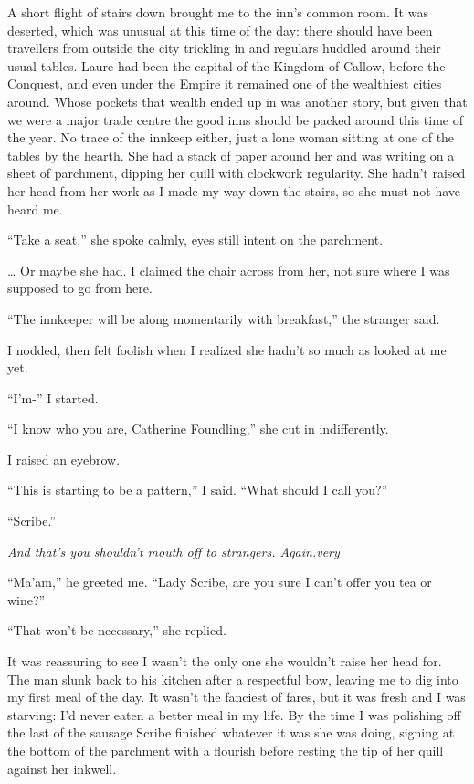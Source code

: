 \documentclass[12pt, openany]{book}
\begin{document}
A short flight of stairs down brought me to the inn’s common room. It was deserted, which was unusual at this time of the day: there should have been travellers from outside the city trickling in and regulars huddled around their usual tables. Laure had been the capital of the Kingdom of Callow, before the Conquest, and even under the Empire it remained one of the wealthiest cities around. Whose pockets that wealth ended up in was another story, but given that we were a major trade centre the good inns should be packed around this time of the year. No trace of the innkeep either, just a lone woman sitting at one of the tables by the hearth. She had a stack of paper around her and was writing on a sheet of parchment, dipping her quill with clockwork regularity. She hadn’t raised her head from her work as I made my way down the stairs, so she must not have heard me.

“Take a seat,” she spoke calmly, eyes still intent on the parchment.

… Or maybe she had. I claimed the chair across from her, not sure where I was supposed to go from here.

“The innkeeper will be along momentarily with breakfast,” the stranger said.

I nodded, then felt foolish when I realized she hadn’t so much as looked at me yet.

“I’m-” I started.

“I know who you are, Catherine Foundling,” she cut in indifferently.

I raised an eyebrow.

“This is starting to be a pattern,” I said. “What should I call you?”

“Scribe.”

\textit{And that’s you shouldn’t mouth off to strangers. Again.}\textit{very}

“Ma’am,” he greeted me. “Lady Scribe, are you sure I can’t offer you tea or wine?”

“That won’t be necessary,” she replied.

It was reassuring to see I wasn’t the only one she wouldn’t raise her head for. The man slunk back to his kitchen after a respectful bow, leaving me to dig into my first meal of the day. It wasn’t the fanciest of fares, but it was fresh and I was starving: I’d never eaten a better meal in my life. By the time I was polishing off the last of the sausage Scribe finished whatever it was she was doing, signing at the bottom of the parchment with a flourish before resting the tip of her quill against her inkwell.
\end{document}
